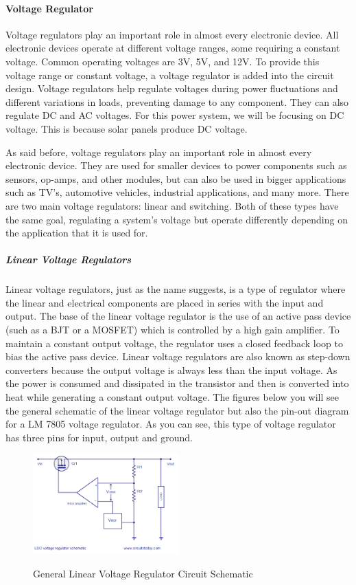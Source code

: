 \paragraph{Voltage Regulator}
Voltage regulators play an important role in almost every electronic device. All electronic devices operate at different voltage ranges, some requiring a constant voltage. Common operating voltages are 3V, 5V, and 12V. To provide this voltage range or constant voltage, a voltage regulator is added into the circuit design. Voltage regulators help regulate voltages during power fluctuations and different variations in loads, preventing damage to any component. They can also regulate DC and AC voltages. For this power system, we will be focusing on DC voltage. This is because solar panels produce DC voltage. \par
As said before, voltage regulators play an important role in almost every electronic device. They are used for smaller devices to power components such as sensors, op-amps, and other modules, but can also be used in bigger applications such as TV’s, automotive vehicles, industrial applications, and many more. There are two main voltage regulators: linear and switching. Both of these types have the same goal, regulating a system’s voltage but operate differently depending on the application that it is used for. \par
\subparagraph{Linear Voltage Regulators}
Linear voltage regulators, just as the name suggests, is a type of regulator where the linear and electrical components are placed in series with the input and output. The base of the linear voltage regulator is the use of an active pass device (such as a BJT or a MOSFET) which is controlled by a high gain amplifier. To maintain a constant output voltage, the regulator uses a closed feedback loop to bias the active pass device. Linear voltage regulators are also known as step-down converters because the output voltage is always less than the input voltage. As the power is consumed and dissipated in the transistor and then is converted into heat while generating a constant output voltage. The figures below you will see the general schematic of the linear voltage regulator but also the pin-out diagram for a LM 7805 voltage regulator. As you can see, this type of voltage regulator has three pins for input, output and ground.\par
\begin{figure}[H]
    \caption{General Linear Voltage Regulator Circuit Schematic}
    \centering
    \includegraphics[width=0.5\textwidth]{images/Gen_Linear_Voltage_Regulator.png}
    \label{fig:general-linear-voltage-regulator}
\end{figure}

